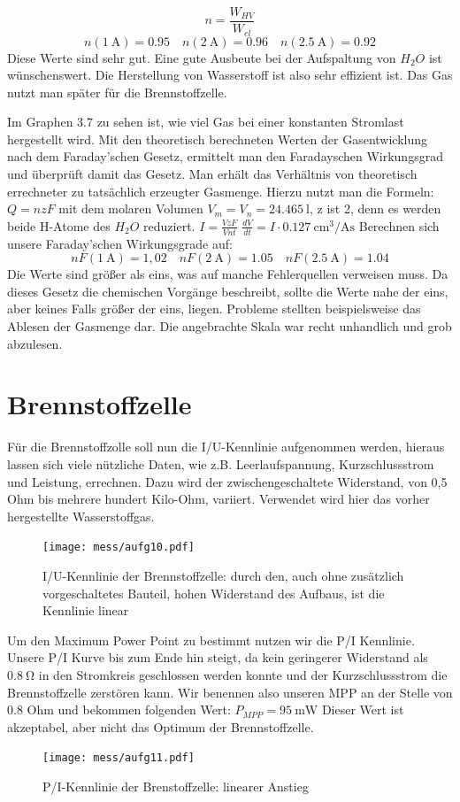 \[ n=\frac{W_{HV}}{W_{el}} \]
\[
n(\SI{1}{\ampere})=0.95 \quad
n(\SI{2}{\ampere})=0.96 \quad
n(\SI{2,5}{\ampere})=0.92
\]
Diese Werte sind sehr gut. Eine gute Ausbeute bei der Aufspaltung von $H_2O$ ist wünschenswert.
Die Herstellung von Wasserstoff ist also sehr effizient ist. Das Gas nutzt man später für die Brennstoffzelle.

Im Graphen 3.7 zu sehen ist, wie viel Gas bei einer konstanten Stromlast hergestellt wird. Mit den theoretisch berechneten Werten der Gasentwicklung nach dem Faraday’schen Gesetz, ermittelt man den Faradayschen Wirkungsgrad und überprüft damit das Gesetz. Man erhält das Verhältnis von theoretisch errechneter zu tatsächlich erzeugter Gasmenge.
Hierzu nutzt man die Formeln:
$Q=nzF$
mit dem molaren Volumen $V_m=V_n=\SI{24,465}{\litre}$,
z ist 2, denn es werden beide H-Atome des $H_2O$ reduziert.
$I=\frac{VzF}{Vnt}$
$\frac{dV}{dt}=I \cdot \SI{0.127}{\centi \meter \cubed \per \ampere \second}$
Berechnen sich unsere Faraday’schen Wirkungsgrade auf:
\[
nF(\SI{1}{\ampere})=1,02 \quad nF(\SI{2}{\ampere}) = 1.05 \quad nF(\SI{2.5}{\ampere})=1.04
\]
Die Werte sind größer als eins, was auf manche Fehlerquellen verweisen muss. Da dieses Gesetz die chemischen Vorgänge beschreibt, sollte die Werte nahe der eins, aber keines Falls größer der eins, liegen.
Probleme stellten beispielsweise das Ablesen der Gasmenge dar.
Die angebrachte Skala war recht unhandlich und grob abzulesen.


\section{Brennstoffzelle}

Für die Brennstoffzolle soll nun die I/U-Kennlinie aufgenommen werden, hieraus lassen sich viele nützliche Daten, wie z.B. Leerlaufspannung, Kurzschlussstrom und Leistung, errechnen. Dazu wird der zwischengeschaltete Widerstand, von 0,5 Ohm bis mehrere hundert Kilo-Ohm, variiert. Verwendet wird hier das vorher hergestellte Wasserstoffgas.
\begin{figure}
	\centering
	\texttt{[image: mess/aufg10.pdf]}
	\caption{I/U-Kennlinie der Brennstoffzelle: durch den, auch ohne zusätzlich vorgeschaltetes Bauteil, hohen Widerstand des Aufbaus, ist die Kennlinie linear}
	\label{a10}
\end{figure}

Um den Maximum Power Point zu bestimmt nutzen wir die P/I Kennlinie. Unsere P/I Kurve bis zum Ende hin steigt, da kein geringerer Widerstand als $\SI{0,8}{\ohm}$  in den Stromkreis geschlossen werden konnte und der Kurzschlussstrom die Brennstoffzelle zerstören kann.
Wir benennen also unseren MPP an der Stelle von 0.8 Ohm und bekommen folgenden Wert: $P_{MPP} = \SI{95}{\milli \watt}$
Dieser Wert ist akzeptabel, aber nicht das Optimum der Brennstoffzelle.
\begin{figure}[htbp]
	\centering
	\texttt{[image: mess/aufg11.pdf]}
	\caption{P/I-Kennlinie der Brenstoffzelle: linearer Anstieg}
	\label{a11}
\end{figure}


